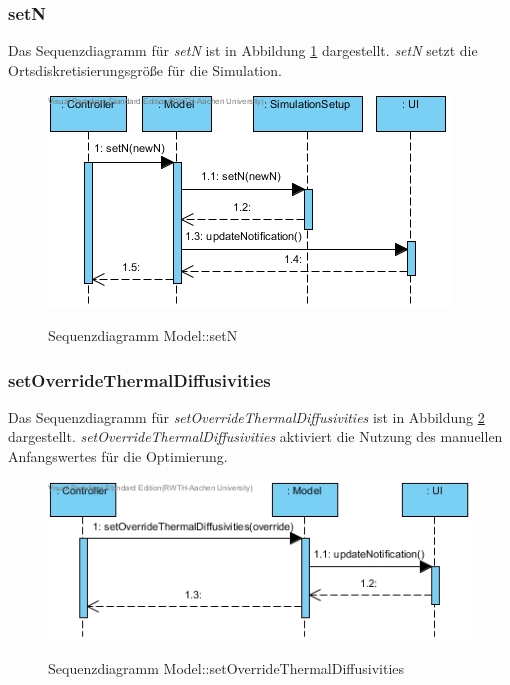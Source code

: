 \subsubsection*{setN}

Das Sequenzdiagramm für \emph{setN} ist in Abbildung \ref{Sequenzdiagramm Model::setN} dargestellt. \emph{setN} setzt die Ortsdiskretisierungsgröße für die Simulation.

\begin{figure}[H]
	\centering
	\includegraphics[scale=.85]{Bilder/Model__setN().jpg}\\
	\caption{Sequenzdiagramm Model::setN}
	\label{Sequenzdiagramm Model::setN}
\end{figure}

\subsubsection*{setOverrideThermalDiffusivities}

Das Sequenzdiagramm für \emph{setOverrideThermalDiffusivities} ist in Abbildung \ref{Sequenzdiagramm Model::setOverrideThermalDiffusivities} dargestellt. \emph{setOverrideThermalDiffusivities} aktiviert die Nutzung des manuellen Anfangswertes für die Optimierung.

\begin{figure}[H]
	\centering
	\includegraphics[scale=.85]{Bilder/Model__setOverrideThermalDiffusivities().jpg}\\
	\caption{Sequenzdiagramm Model::setOverrideThermalDiffusivities}
	\label{Sequenzdiagramm Model::setOverrideThermalDiffusivities}
\end{figure}

